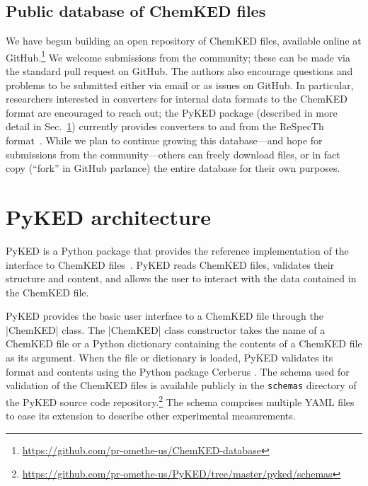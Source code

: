 \documentclass[12pt]{ijck}
\newcommand\ck{ChemKED}
\newcommand\pk{PyKED}
\begin{document}
\subsection{Public database of \ck{} files}
\label{sec:public-database}

We have begun building an open repository of \ck{} files, available online at
GitHub.\footnote{\url{https://github.com/pr-omethe-us/ChemKED-database}}
We welcome submissions from the community; these can be made via the standard pull request
on GitHub. The authors also encourage questions and problems to be submitted either via
email or as issues on GitHub. In particular, researchers interested in converters for
internal data formats to the \ck{} format are encouraged to reach out;
the \pk{} package (described in more detail in Sec.~\ref{sec:pyked-architecture})
currently provides converters to and from the ReSpecTh format~\autocite{Varga2017}.
While we plan to continue growing this database---and hope for submissions from
the community---others can freely download files, or in fact copy (``fork'' in GitHub
parlance) the entire database for their own purposes.

\section{PyKED architecture}
\label{sec:pyked-architecture}
%
\pk{} is a Python package that provides the reference implementation
of the interface to \ck{} files~\autocite{PyKED}. \pk{} reads \ck{} files, validates
their structure and content, and allows the user to interact with the data contained
in the \ck{} file.

\pk{} provides the basic user interface to a \ck{} file through the
\pybox|ChemKED| class. The \pybox|ChemKED| class constructor takes the name
of a \ck{} file or a Python dictionary containing the contents of a \ck{} file
as its argument. When the file or dictionary is loaded, \pk{} validates its
format and contents using the Python package Cerberus \autocite{cerberus}. The
schema used for validation of the \ck{} files is available publicly in the
\texttt{schemas} directory of the PyKED source code
repository.\footnote{\url{https://github.com/pr-omethe-us/PyKED/tree/master/pyked/schemas}}
The schema comprises multiple YAML files to ease its extension to describe other
experimental measurements.
\end{document}
